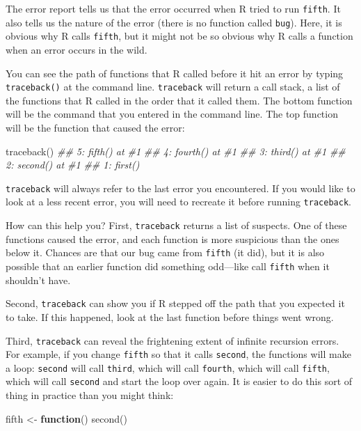 \documentclass[
  letterpaper,
  DIV=11,
  numbers=noendperiod]{scrbook}
\newenvironment{Shaded}{\begin{snugshade}}{\end{snugshade}}
\newcommand{\ControlFlowTok}[1]{\textcolor[rgb]{0.00,0.23,0.31}{\textbf{#1}}}
\newcommand{\DocumentationTok}[1]{\textcolor[rgb]{0.37,0.37,0.37}{\textit{#1}}}
\newcommand{\FunctionTok}[1]{\textcolor[rgb]{0.28,0.35,0.67}{#1}}
\newcommand{\NormalTok}[1]{\textcolor[rgb]{0.00,0.23,0.31}{#1}}
\newcommand{\OtherTok}[1]{\textcolor[rgb]{0.00,0.23,0.31}{#1}}
\begin{document}
The error report tells us that the error occurred when R tried to run
\texttt{fifth}. It also tells us the nature of the error (there is no
function called \texttt{bug}). Here, it is obvious why R calls
\texttt{fifth}, but it might not be so obvious why R calls a function
when an error occurs in the wild.

You can see the path of functions that R called before it hit an error
by typing \texttt{traceback()} at the command line. \texttt{traceback}
will return a call stack, a list of the functions that R called in the
order that it called them. The bottom function will be the command that
you entered in the command line. The top function will be the function
that caused the error:

\begin{Shaded}
\begin{Highlighting}[]
\FunctionTok{traceback}\NormalTok{()}
\DocumentationTok{\#\# 5: fifth() at \#1}
\DocumentationTok{\#\# 4: fourth() at \#1}
\DocumentationTok{\#\# 3: third() at \#1}
\DocumentationTok{\#\# 2: second() at \#1}
\DocumentationTok{\#\# 1: first()}
\end{Highlighting}
\end{Shaded}

\texttt{traceback} will always refer to the last error you encountered.
If you would like to look at a less recent error, you will need to
recreate it before running \texttt{traceback}.

How can this help you? First, \texttt{traceback} returns a list of
suspects. One of these functions caused the error, and each function is
more suspicious than the ones below it. Chances are that our bug came
from \texttt{fifth} (it did), but it is also possible that an earlier
function did something odd---like call \texttt{fifth} when it shouldn't
have.

Second, \texttt{traceback} can show you if R stepped off the path that
you expected it to take. If this happened, look at the last function
before things went wrong.

Third, \texttt{traceback} can reveal the frightening extent of infinite
recursion errors. For example, if you change \texttt{fifth} so that it
calls \texttt{second}, the functions will make a loop: \texttt{second}
will call \texttt{third}, which will call \texttt{fourth}, which will
call \texttt{fifth}, which will call \texttt{second} and start the loop
over again. It is easier to do this sort of thing in practice than you
might think:

\begin{Shaded}
\begin{Highlighting}[]
\NormalTok{fifth }\OtherTok{\textless{}{-}} \ControlFlowTok{function}\NormalTok{() }\FunctionTok{second}\NormalTok{()}
\end{Highlighting}
\end{Shaded}
\end{document}

